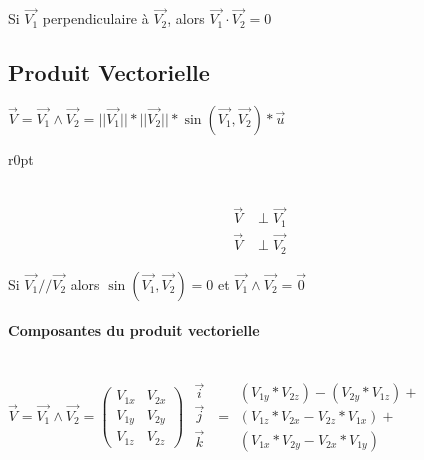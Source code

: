 Si $\vec{V_1}$ perpendiculaire à $\vec{V_2}$, alors $\vec{V_1}\cdot\vec{V_2} = 0$

\subsection{Produit Vectorielle}

$\vec{V} = \vec{V_1} \wedge \vec{V_2} = ||\vec{V_1}||*||\vec{V_2}||*\sin(\vec{V_1}, \vec{V_2})*\vec{u}$

\begin{wrapfigure}[5]{r}{0pt}
\end{wrapfigure}
~\\

\begin{align*}
\vec{V} &\perp \vec{V_1} \\
	\vec{V} &\perp \vec{V_2}
\end{align*}

Si $\vec{V_1} // \vec{V_2}$ alors $\sin(\vec{V_1}, \vec{V_2}) = 0$ et $\vec{V_1} \wedge \vec{V_2} = \vec{0}$

\paragraph{Composantes du produit vectorielle}
~\\
$\vec{V} = \vec{V_1} \wedge \vec{V_2} = 
	\left(
		\begin{array}{rl}
		V_{1x} & V_{2x} \\
		V_{1y} & V_{2y} \\
		V_{1z} & V_{2z}
		\end{array}
	\right)$
$	\begin{array}{c}
		\vec{i} \\
		\vec{j} \\
		\vec{k} \\

	\end{array}$
	$=
	\begin{array}{c}
		(V_{1y} * V_{2z})-(V_{2y}*V_{1z}) + \\
		(V_{1z}*V_{2x} - V_{2z}*V_{1x}) + \\
		(V_{1x}*V_{2y} - V_{2x}*V_{1y}) 
	\end{array}$

